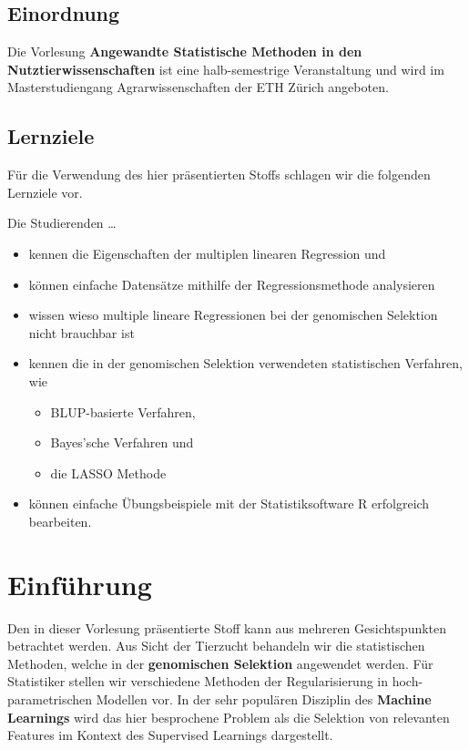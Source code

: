 \documentclass[]{book}
\providecommand{\tightlist}{%
  \setlength{\itemsep}{0pt}\setlength{\parskip}{0pt}}
\begin{document}
\section*{Einordnung}\label{einordnung}

Die Vorlesung \textbf{Angewandte Statistische Methoden in den
Nutztierwissenschaften} ist eine halb-semestrige Veranstaltung und wird
im Masterstudiengang Agrarwissenschaften der ETH Zürich angeboten.

\section*{Lernziele}\label{lernziele}

Für die Verwendung des hier präsentierten Stoffs schlagen wir die
folgenden Lernziele vor.

Die Studierenden \ldots{}

\begin{itemize}
\tightlist
\item
  kennen die Eigenschaften der multiplen linearen Regression und
\item
  können einfache Datensätze mithilfe der Regressionsmethode analysieren
\item
  wissen wieso multiple lineare Regressionen bei der genomischen
  Selektion nicht brauchbar ist
\item
  kennen die in der genomischen Selektion verwendeten statistischen
  Verfahren, wie

  \begin{itemize}
  \tightlist
  \item
    BLUP-basierte Verfahren,
  \item
    Bayes'sche Verfahren und
  \item
    die LASSO Methode
  \end{itemize}
\item
  können einfache Übungsbeispiele mit der Statistiksoftware R
  erfolgreich bearbeiten.
\end{itemize}

\chapter{Einführung}\label{intro}

Den in dieser Vorlesung präsentierte Stoff kann aus mehreren
Gesichtspunkten betrachtet werden. Aus Sicht der Tierzucht behandeln wir
die statistischen Methoden, welche in der \textbf{genomischen Selektion}
angewendet werden. Für Statistiker stellen wir verschiedene Methoden der
Regularisierung in hoch-parametrischen Modellen vor. In der sehr
populären Disziplin des \textbf{Machine Learnings} wird das hier
besprochene Problem als die Selektion von relevanten Features im Kontext
des Supervised Learnings dargestellt.
\end{document}

